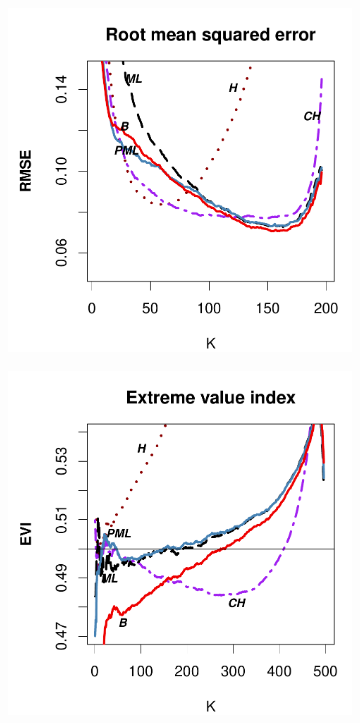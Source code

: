 \begin{figure}[h]
\begin{subfigure}[h]{0.40\linewidth}
			\includegraphics[width=\textwidth]{./plots/paper1/RMSE_Outputfrehet0,5200.pdf}
		\end{subfigure}
		\bigskip
		\centering
		\begin{subfigure}[h]{0.40\linewidth}
			\includegraphics[width=\textwidth]{./plots/paper1/EVI_Outputfrehet0,5500.pdf}

\end{subfigure}
\end{figure}
